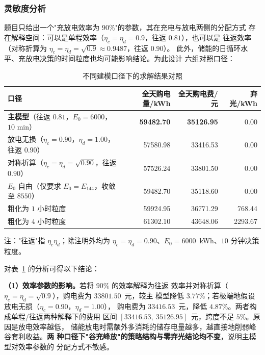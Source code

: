 \subsubsection{灵敏度分析}

题目只给出一个"充放电效率为 $90\%$"的参数，其在充电与放电两侧的分配方式
存在解释空间：可以是单程效率（$\eta_c=\eta_d=0.9$，往返 $0.81$），也可以是
往返效率（对称折算为 $\eta_c=\eta_d=\sqrt{0.9}\approx0.9487$，往返 $0.90$）。
此外，储能的日循环水平、充放电决策的时间粒度也均可能影响结论。为此设计
六组对照口径：

\begin{table}[htbp]
  \centering
  \caption{不同建模口径下的求解结果对照}
  \label{tab:p1-sensitivity}
  \small
  \begin{tabular}{lrrr}
    \toprule
    口径 & 全天购电量/kWh & 全天购电费/元 & 弃光/kWh \\
    \midrule
    \textbf{主模型}（往返 $0.81$，$E_0=6000$，$10$ min）
      & \textbf{59482.70} & \textbf{35126.95} & 0.00 \\
    放电无损（$\eta_c=0.90$，$\eta_d=1.00$，往返 $0.90$）
      & 57580.98 & 33416.53 & 0.00 \\
    对称折算（$\eta_c=\eta_d=\sqrt{0.90}$，往返 $0.90$）
      & 57526.24 & 33801.50 & 0.00 \\
    $E_0$ 自由（仅要求 $E_0=E_{144}$，收敛至 $8550$）
      & 59482.70 & 35118.60 & 0.00 \\
    粗化为 $1$ 小时粒度
      & 59924.95 & 36771.29 & 768.44 \\
    粗化为 $4$ 小时粒度
      & 61302.10 & 43648.06 & 2293.67 \\
    \bottomrule
  \end{tabular}
  \par\vspace{2pt}
  \begin{minipage}{\textwidth}
    \footnotesize 注："往返"指 $\eta_c\eta_d$；除注明外均为
    $\eta_c=\eta_d=0.90$、$E_0=6000$~kWh、$10$ 分钟决策粒度。
  \end{minipage}
\end{table}

对表~\ref{tab:p1-sensitivity} 的分析可得以下结论：

\textbf{（1）效率参数的影响。}若将 $90\%$ 的效率解释为往返
效率并对称折算（$\eta_c=\eta_d=\sqrt{0.9}$），购电费为 $33801.50$~元，较主
模型降低 $3.77\%$；若极端地假设放电无损（$\eta_c=0.90$，$\eta_d=1.00$），
购电费为 $33416.53$~元，降低 $4.87\%$。两者构成单程/往返两种解释下的费用
区间 $[33416.53,\ 35126.95]$~元，跨度不足 $5\%$。原因是放电效率越低，
储能放电时需额外多消耗的储存电量越多，越直接地削弱峰谷套利收益。\textbf{两
种口径下"谷充峰放"的策略结构与零弃光结论均不变}，说明主模型对效率参数的
分配方式不敏感。

